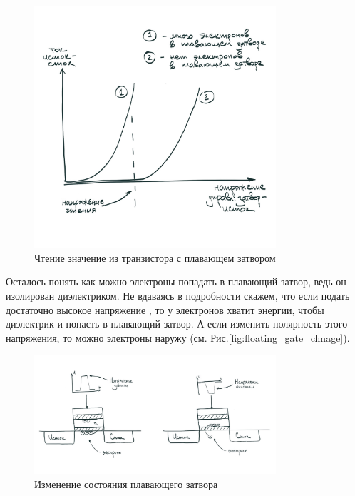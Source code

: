 \begin{figure}[H]
\centering
% 
\includegraphics[width=0.8\textwidth]{images/lab_6/floating_gate_read}
\caption{Чтение значение из транзистора с плавающем затвором}
\label{fig:floating_gate_read}
\end{figure}

\par{Осталось понять как можно  электроны попадать в плавающий затвор, ведь он изолирован диэлектриком. Не вдаваясь в подробности скажем, что если подать достаточно высокое напряжение , то у электронов хватит энергии, чтобы  диэлектрик и попасть в плавающий затвор. А если изменить полярность этого напряжения, то можно  электроны наружу (см. Рис.\ref{fig:floating_gate_chnage}).}

\begin{figure}[H]
\centering
% 
\includegraphics[width=0.8\textwidth]{images/lab_6/floating_gate_change}
\caption{Изменение состояния плавающего затвора}
\label{fig:floating_gate_write}
\end{figure}

